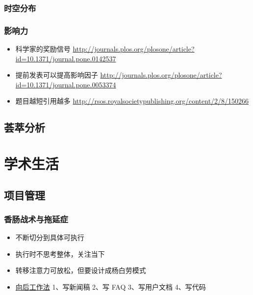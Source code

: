 \documentclass[]{tufte-book}
\providecommand{\tightlist}{%
  \setlength{\itemsep}{0pt}\setlength{\parskip}{0pt}}
\begin{document}
\hypertarget{ux65f6ux7a7aux5206ux5e03}{%
\subsection{时空分布}\label{ux65f6ux7a7aux5206ux5e03}}

\hypertarget{ux5f71ux54cdux529b}{%
\subsection{影响力}\label{ux5f71ux54cdux529b}}

\begin{itemize}
\tightlist
\item
  科学家的奖励信号 \url{http://journals.plos.org/plosone/article?id=10.1371/journal.pone.0142537}
\item
  提前发表可以提高影响因子 \url{http://journals.plos.org/plosone/article?id=10.1371/journal.pone.0053374}
\item
  题目越短引用越多 \url{http://rsos.royalsocietypublishing.org/content/2/8/150266}
\end{itemize}

\hypertarget{ux835fux8403ux5206ux6790}{%
\section{荟萃分析}\label{ux835fux8403ux5206ux6790}}

\hypertarget{life}{%
\chapter{学术生活}\label{life}}

\hypertarget{ux9879ux76eeux7ba1ux7406}{%
\section{项目管理}\label{ux9879ux76eeux7ba1ux7406}}

\hypertarget{ux9999ux80a0ux6218ux672fux4e0eux62d6ux5ef6ux75c7}{%
\subsection{香肠战术与拖延症}\label{ux9999ux80a0ux6218ux672fux4e0eux62d6ux5ef6ux75c7}}

\begin{itemize}
\item
  不断切分到具体可执行
\item
  执行时不思考整体，关注当下
\item
  转移注意力可放松，但要设计成杨白劳模式
\item
  \href{https://www.allthingsdistributed.com/2006/11/working_backwards.html}{向后工作法}
  1、写新闻稿
  2、写 FAQ
  3、写用户文档
  4、写代码
\end{itemize}
\end{document}
